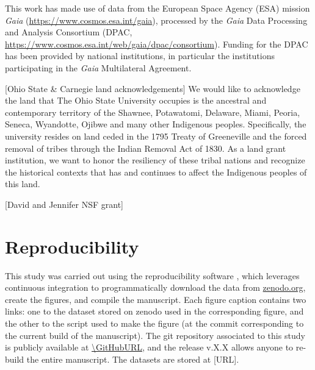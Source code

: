 \documentclass[twocolumn,twocolappendix,linenumbers,trackchanges]{aastex631}
\newcommand{\vice}{{\tt VICE}\xspace}
\begin{document}
\begin{acknowledgments}
    This work has made use of data from the European Space Agency (ESA) mission
    {\it Gaia} (\url{https://www.cosmos.esa.int/gaia}), processed by the {\it Gaia}
    Data Processing and Analysis Consortium (DPAC,
    \url{https://www.cosmos.esa.int/web/gaia/dpac/consortium}). Funding for the DPAC
    has been provided by national institutions, in particular the institutions
    participating in the {\it Gaia} Multilateral Agreement.

    [Ohio State \& Carnegie land acknowledgements]
    We would like to acknowledge the land that The Ohio State University occupies is the ancestral and contemporary territory of the Shawnee, Potawatomi, Delaware, Miami, Peoria, Seneca, Wyandotte, Ojibwe and many other Indigenous peoples. Specifically, the university resides on land ceded in the 1795 Treaty of Greeneville and the forced removal of tribes through the Indian Removal Act of 1830. As a land grant institution, we want to honor the resiliency of these tribal nations and recognize the historical contexts that has and continues to affect the Indigenous peoples of this land.

    [David and Jennifer NSF grant]
\end{acknowledgments}

\software{\vice \citep{JohnsonWeinberg2020-Starbursts}, Astropy \citep{astropy2013,astropy2018,astropy2022}, scikit-learn \citep{Pedregosa2011-ScikitLearn}, SciPy \citep{2020SciPy-NMeth}, Matplotlib \citep{Hunter2007-Matplotlib}}

\appendix

\section{Reproducibility}
\label{app:reproducibility}

This study was carried out using the reproducibility software
\href{https://github.com/showyourwork/showyourwork}{\showyourwork}
\citep{Luger2021-showyourwork}, which leverages continuous integration to
programmatically download the data from
\href{https://zenodo.org/}{zenodo.org}, create the figures, and
compile the manuscript. Each figure caption contains two links: one
to the dataset stored on zenodo used in the corresponding figure,
and the other to the script used to make the figure (at the commit
corresponding to the current build of the manuscript). The git
repository associated to this study is publicly available at
\url{\GitHubURL}, and the release v.X.X allows anyone to re-build the entire 
manuscript. The datasets are stored at [URL].
\end{document}
